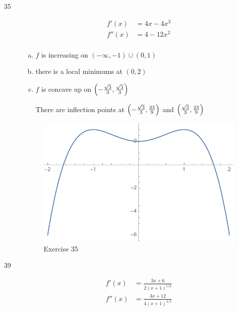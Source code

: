 \documentclass[letterpaper, landscape]{exam}
\begin{document}
\begin{description}
    \newpage

    \item[35]
      \begin{align*}
        f'(x)  & = 4x - 4x^3 \\
        f''(x) & = 4 - 12x^2 \\
      \end{align*}

      \begin{enumerate}[(a)]
        \item $f$ is increasing on $(-\infty, -1) \cup (0, 1)$

        \item there is a local minimums at $(0, 2)$ 

        \item $f$ is concave up on $\del{ -\frac{\sqrt{3}}{3}, \frac{\sqrt{3}}{3} }$ 
          
          There are inflection points at $\del{ -\frac{\sqrt{3}}{3}, \frac{23}{9} }$ and 
          $\del{ \frac{\sqrt{3}}{3}, \frac{23}{9} }$

      \end{enumerate}

      \begin{figure}[H]
        \centering
        \includegraphics[scale = 0.6]{ex35.pdf}
        \caption{Exercise 35}
        \label{fig:ex35}
      \end{figure}

    \newpage

    \item[39]
      \begin{align*}
        f'(x)  & = \frac{3x + 6}{2 (x + 1)^{1/2}} \\
        f''(x) & = \frac{3x + 12}{4 (x + 1)^{3/2}} \\
      \end{align*}


\end{description}
\end{document}
